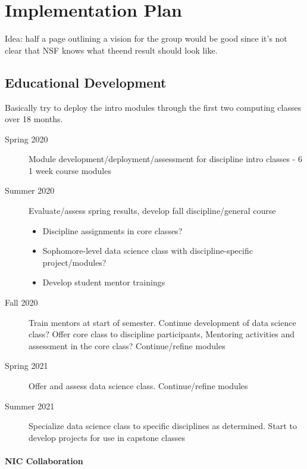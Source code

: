 \section{Implementation Plan}
Idea: half a page outlining a vision for the group would be good since it's not clear that NSF knows what theend result should look like.

\subsection{Educational Development}
Basically try to deploy the intro modules through the first two computing classes over 18 months.
\begin{description}
    \item[Spring 2020] Module development/deployment/assessment for discipline intro classes - 6 1 week course modules
    \item[Summer 2020] Evaluate/assess spring results, develop fall discipline/general course
    \begin{itemize}
        \item Discipline assignments in core classes?
        \item Sophomore-level data science class with discipline-specific project/modules?
        \item Develop student mentor trainings
    \end{itemize}
    \item[Fall 2020] Train mentors at start of semester. Continue development of data science class? Offer core class to discipline participants, Mentoring activities and assessment in the core class? Continue/refine modules
    \item[Spring 2021] Offer and assess data science class. Continue/refine modules
    \item[Summer 2021] Specialize data science class to specific disciplines as determined. Start to develop projects for use in capstone classes
\end{description}

\paragraph{NIC Collaboration}

